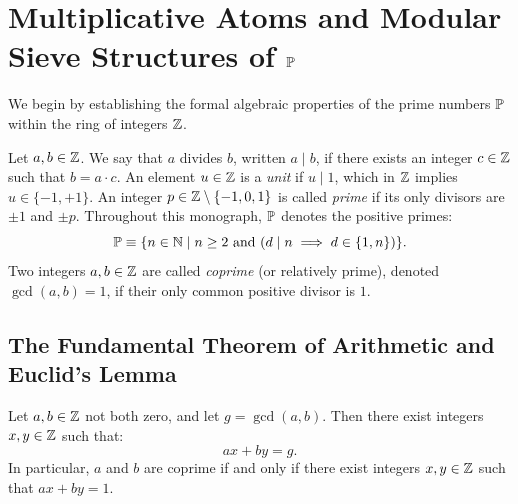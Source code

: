 \section{Multiplicative Atoms and Modular Sieve Structures of \texorpdfstring{$\mathbb{P}$}{P}}

We begin by establishing the formal algebraic properties of the prime numbers $\mathbb{P}$ within the ring of integers $\mathbb{Z}$.

\begin{definition}
\label{def:primes_units}
\leanok
Let $a, b \in \mathbb{Z}$. We say that $a$ divides $b$, written $a \mid b$, if there exists an integer $c \in \mathbb{Z}$ such that $b = a \cdot c$. An element $u \in \mathbb{Z}$ is a \emph{unit} if $u \mid 1$, which in $\mathbb{Z}$ implies $u \in \{-1, +1\}$. An integer $p \in \mathbb{Z} \setminus \{-1, 0, 1\}$ is called \emph{prime} if its only divisors are $\pm 1$ and $\pm p$. Throughout this monograph, $\mathbb{P}$ denotes the positive primes:
\begin{equation}
\mathbb{P} \equiv \{n \in \mathbb{N} \mid n \ge 2 \text{ and } (d \mid n \implies d \in \{1, n\})\}.
\end{equation}
Two integers $a, b \in \mathbb{Z}$ are called \emph{coprime} (or relatively prime), denoted $\gcd(a, b) = 1$, if their only common positive divisor is $1$.
\end{definition}

\subsection{The Fundamental Theorem of Arithmetic and Euclid's Lemma}

\begin{lemma}
\label{lem:bezout}
\leanok
Let $a, b \in \mathbb{Z}$ not both zero, and let $g = \gcd(a, b)$. Then there exist integers $x, y \in \mathbb{Z}$ such that:
\begin{equation}
\label{eq:bezout}
a x + b y = g.
\end{equation}
In particular, $a$ and $b$ are coprime if and only if there exist integers $x, y \in \mathbb{Z}$ such that $a x + b y = 1$.
\end{lemma}

